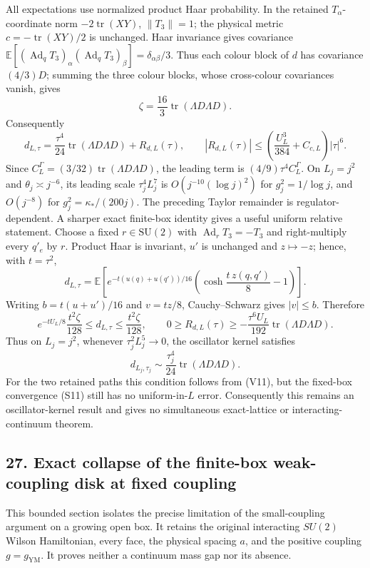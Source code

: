 \documentclass[
  11pt,
]{article}
\begin{document}
All expectations use normalized product Haar probability. In the
retained \(T_\alpha\)-coordinate norm \(-2\operatorname{tr}(XY)\),
\(\|T_3\|=1\); the physical metric \(c=-\operatorname{tr}(XY)/2\) is
unchanged. Haar invariance gives covariance
\(\mathbb E[(\operatorname{Ad}_qT_3)_\alpha(\operatorname{Ad}_qT_3)_\beta]=\delta_{\alpha\beta}/3\).
Thus each colour block of \(d\) has covariance \((4/3)D\); summing the
three colour blocks, whose cross-colour covariances vanish, gives \[
\zeta=\frac{16}{3}\operatorname{tr}(\Lambda D\Lambda D).
\] Consequently \[
\boxed{d_{L,\tau}=\frac{\tau^4}{24}\operatorname{tr}(\Lambda D\Lambda D)+R_{d,L}(\tau)},
\qquad |R_{d,L}(\tau)|\le\left(\frac{U_L^3}{384}+C_{c,L}\right)|\tau|^6.
\] Since \(C_L^\Gamma=(3/32)\operatorname{tr}(\Lambda D\Lambda D)\), the
leading term is \((4/9)\tau^4C_L^\Gamma\). On \(L_j=j^2\) and
\(\theta_j\asymp j^{-6}\), its leading scale \(\tau_j^4L_j^7\) is
\(O(j^{-10}(\log j)^2)\) for \(g_j^2=1/\log j\), and \(O(j^{-8})\) for
\(g_j^2=\kappa_*/(200j)\). The preceding Taylor remainder is
regulator-dependent. A sharper exact finite-box identity gives a useful
uniform relative statement. Choose a fixed \(r\in\mathrm{SU}(2)\) with
\(\operatorname{Ad}_rT_3=-T_3\) and right-multiply every \(q'_e\) by
\(r\). Product Haar is invariant, \(u'\) is unchanged and
\(z\mapsto-z\); hence, with \(t=\tau^2\), \[
 d_{L,\tau}=\mathbb E\!\left[e^{-t(u(q)+u(q'))/16}
 \left(\cosh\!\frac{t\,z(q,q')}{8}-1\right)\right].
\] Writing \(b=t(u+u')/16\) and \(v=tz/8\), Cauchy--Schwarz gives
\(|v|\le b\). Therefore \[
 e^{-tU_L/8}\frac{t^2\zeta}{128}
 \le d_{L,\tau}\le\frac{t^2\zeta}{128},
 \qquad
 0\ge R_{d,L}(\tau)\ge
 -\frac{\tau^6U_L}{192}\operatorname{tr}(\Lambda D\Lambda D).
\] Thus on \(L_j=j^2\), whenever \(\tau_j^2L_j^5\to0\), the oscillator
kernel satisfies \[
 d_{L_j,\tau_j}\sim\frac{\tau_j^4}{24}
 \operatorname{tr}(\Lambda D\Lambda D).
\] For the two retained paths this condition follows from (V11), but the
fixed-box convergence (S11) still has no uniform-in-\(L\) error.
Consequently this remains an oscillator-kernel result and gives no
simultaneous exact-lattice or interacting-continuum theorem.

\subsection{27. Exact collapse of the finite-box weak-coupling disk at
fixed
coupling}\label{exact-collapse-of-the-finite-box-weak-coupling-disk-at-fixed-coupling}

This bounded section isolates the precise limitation of the
small-coupling argument on a growing open box. It retains the original
interacting \(SU(2)\) Wilson Hamiltonian, every face, the physical
spacing \(a\), and the positive coupling \(g=g_{\mathrm{YM}}\). It
proves neither a continuum mass gap nor its absence.
\end{document}
